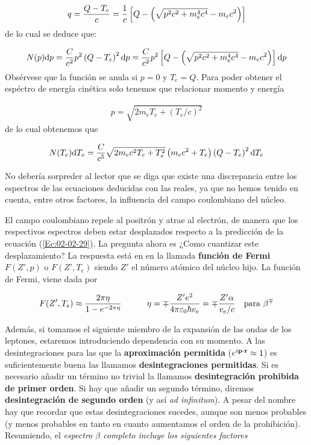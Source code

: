 \begin{eqnarray}
	q = \frac{Q-T_e}{c} = \frac{1}{c} \left[ Q- \left(  \sqrt{p^2 c^2 + m_e^4 c ^4} -m_ec^2 \right) \right]
\end{eqnarray}
de lo cual se deduce que:

\begin{eqnarray}
	N(p) \mathrm{d} p = \frac{C}{c^2} p^2 \left( Q-T_e \right)^2 \mathrm{d} p = \frac{C}{c^2} p^2 \left[ Q- \left(  \sqrt{p^2 c^2 + m_e^4 c ^4} -m_ec^2 \right)  \right] \mathrm{d} p
\end{eqnarray}
Obsérvese que la función se anula si $p=0$  y $T_e=Q$. Para poder obtener el espéctro de energía cinética solo tenemos que relacionar momento y energía

\begin{eqnarray}
	p=\sqrt{2m_eT_e+(T_e/c)^2}
\end{eqnarray}
de lo cual obtenemos que

\begin{eqnarray}
	N(T_e) \mathrm{d} T_e = \frac{C}{c^5} \sqrt{2m_e c^2 T_e + T_e^2} \left( m_e c^2 + T_e \right) \left( Q-T_e \right)^2 \mathrm{d} T_e \label{Ec:02-02-29}
\end{eqnarray}

No debería sorpreder al lector que se diga que existe una discrepancia entre los espectros de las ecuaciones deducidas con las reales, ya que no hemos tenido en cuenta, entre otros factores, la influencia del campo coulombiano del núcleo. 

El campo coulombiano repele al positrón y atrae al electrón, de manera que los respectivos espectros deben estar desplazados respecto a la predicción de la ecuación (\ref{Ec:02-02-29}). La pregunta ahora es ¿Como cuantizar este desplazamiento? La respuesta está en en la llamada \textbf{función de Fermi} $F(Z',p)$ o $F(Z',T_e)$ siendo $Z'$ el número atómico del núcleo hijo. La función de Fermi, viene dada por

\begin{eqnarray}
	F(Z',T_e) \approx \frac{2\pi \eta}{1-e^{-2\pi \eta}} \quad \quad \quad \eta = \mp \frac{Z'e^2}{4\pi \varepsilon_0 \hbar v_e} = \mp \frac{Z' \alpha}{v_e/c} \quad \text{para} \ \beta^{\mp}
\end{eqnarray}

Además, si tomamos el siguiente miembro de la expansión de las ondas de los leptones, estaremos introduciendo dependencia con su momento. A las desintegraciones para las que la \textbf{aproximación permitida} ($e^{i\mathbf{p} \cdot \mathbf{r}}\approx 1$) es suficientemente buena las llamamos \textbf{desintegraciones permitidas}. Si es necesario añadir un término no trivial la llamamos \textbf{desintegración prohibida de primer orden}. Si hay que añadir un segundo término, diremos \textbf{desintegración de segundo orden} (y así \textit{ad infinitum}). A pesar del nombre hay que recordar que estas desintegraciones sucedes, aunque son menos probables (y menos probables en tanto en cuanto aumentamos el orden de la prohibición). Resumiendo, el \textit{espectro $\beta$ completo incluye los siguientes factores}

